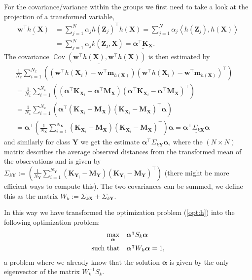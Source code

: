 \documentclass[a4paper, 12pt]{scrartcl}
\newcommand{\cov}{\operatorname{\mathbb{C}ov}}
\newcommand{\bfw}{\mathbf{w}}
\newcommand{\bfX}{\mathbf{X}}
\newcommand{\bfY}{\mathbf{Y}}
\newcommand{\bfZ}{\mathbf{Z}}
\newcommand{\bfmhX}{\mathbf{m}_{h\left(\bfX\right)}}
\newcommand{\inner}[2]{\left\langle #1, #2 \right\rangle}
\newcommand{\bfalpha}{\boldsymbol{\alpha}}
\begin{document}
For the covariance/variance within the groups we first need to take a look at the projection of a transformed variable,
\begin{align*}
\underline{\bfw^\intercal h\left(\bfX\right)} &= \sum_{j=1}^{N}\alpha_j h\left(\bfZ_j\right)^\intercal h\left(\bfX\right)=\sum_{j=1}^{N}\alpha_j \inner{h\left(\bfZ_j\right)}{h\left(\bfX\right)}\\
&=\sum_{j=1}^{N}\alpha_j k\left(\bfZ_j, \bfX\right)=\underline{\bfalpha^\intercal \mathbf{K}_\bfX}.
\end{align*}
The covariance $\underline{\cov\left(\bfw^\intercal h\left(\bfX\right), \bfw^\intercal h\left(\bfX\right)\right)}$ is then estimated by
\begin{align*}
	&\frac{1}{N_x}\sum_{i=1}^{N_x}\left(\left(\bfw^\intercal h\left(\bfX_i\right)-\bfw^\intercal\bfmhX\right)\left(\bfw^\intercal h\left(\bfX_i\right)-\bfw^\intercal\bfmhX\right)^\intercal\right)\hspace{2em}\\
	&=\frac{1}{N_x} \sum_{i=1}^{N_x}\left( \left(\bfalpha^\intercal \mathbf{K}_{\bfX_i} - \bfalpha^\intercal \mathbf{M}_\bfX\right) \left(\bfalpha^\intercal \mathbf{K}_{\bfX_i} - \bfalpha^\intercal \mathbf{M}_\bfX\right)^\intercal \right)\\
	&=\frac{1}{N_x} \sum_{i=1}^{N_x}\left( \bfalpha^\intercal\left(\mathbf{K}_{\bfX_i} - \mathbf{M}_\bfX\right) \left(\mathbf{K}_{\bfX_i} - \mathbf{M}_\bfX\right)^\intercal\bfalpha \right)\\
	&=\bfalpha^\intercal\left(\frac{1}{N_\bfX}\sum_{i=1}^{N_\bfX}\left(\mathbf{K}_{\bfX_i} - \mathbf{M}_\bfX\right)\left(\mathbf{K}_{\bfX_i} - \mathbf{M}_\bfX\right)^\intercal\right)\bfalpha=\underline{\bfalpha^\intercal \Sigma_{k\bfX}\bfalpha}
\end{align*}
and similarly for class $\bfY$ we get the estimate $\bfalpha^\intercal\Sigma_{k\bfY}\bfalpha$, where the $\left(N \times N\right)$ matrix describes the average observed distances from the transformed mean of the observations and is given by $\Sigma_{k\bfY}:=\left(\frac{1}{N_\bfY}\sum_{i=1}^{N_\bfY}\left(\mathbf{K}_{\bfY_i} - \mathbf{M}_\bfY\right)\left(\mathbf{K}_{\bfY_i} - \mathbf{M}_\bfY\right)^\intercal\right)$ (there might be more efficient ways to compute this). The two covariances can be summed, we define this as the matrix $W_k:=\Sigma_{k\bfX}+\Sigma_{k\bfY}$.

In this way we have transformed the optimization problem (\ref{opt:h}) into the following optimization problem:
\begin{equation}\label{opt:k}
\begin{aligned}
\operatornamewithlimits{\mathrm{max}}_{\bfalpha}& & &\bfalpha^\intercal S_k\bfalpha\\
\text{such that}& & &\bfalpha^\intercal W_k\bfalpha=1,
\end{aligned}
\end{equation}
a problem where we already know that the solution $\bfalpha$ is given by the only eigenvector of the matrix $W_k^{-1}S_k$.
\end{document}
